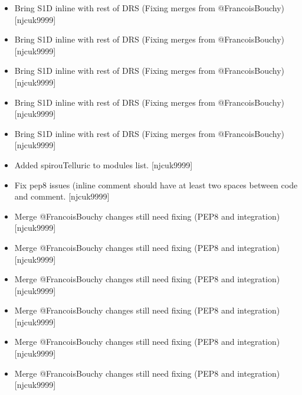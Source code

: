 \documentclass[a4paper,10pt,english]{report}
\begin{document}
\begin{itemize}
\item {} 
Bring S1D  in\sphinxhyphen{}line with rest of DRS (Fixing merges from
@FrancoisBouchy) {[}njcuk9999{]}

\item {} 
Bring S1D  in\sphinxhyphen{}line with rest of DRS (Fixing merges from
@FrancoisBouchy) {[}njcuk9999{]}

\item {} 
Bring S1D  in\sphinxhyphen{}line with rest of DRS (Fixing merges from
@FrancoisBouchy) {[}njcuk9999{]}

\item {} 
Bring S1D  in\sphinxhyphen{}line with rest of DRS (Fixing merges from
@FrancoisBouchy) {[}njcuk9999{]}

\item {} 
Bring S1D  in\sphinxhyphen{}line with rest of DRS (Fixing merges from
@FrancoisBouchy) {[}njcuk9999{]}

\item {} 
Added spirouTelluric to modules list. {[}njcuk9999{]}

\item {} 
Fix pep8 issues (in\sphinxhyphen{}line comment should have at least two spaces
between code and comment. {[}njcuk9999{]}

\item {} 
Merge @FrancoisBouchy changes \sphinxhyphen{} still need fixing (PEP8 and
integration) {[}njcuk9999{]}

\item {} 
Merge @FrancoisBouchy changes \sphinxhyphen{} still need fixing (PEP8 and
integration) {[}njcuk9999{]}

\item {} 
Merge @FrancoisBouchy changes \sphinxhyphen{} still need fixing (PEP8 and
integration) {[}njcuk9999{]}

\item {} 
Merge @FrancoisBouchy changes \sphinxhyphen{} still need fixing (PEP8 and
integration) {[}njcuk9999{]}

\item {} 
Merge @FrancoisBouchy changes \sphinxhyphen{} still need fixing (PEP8 and
integration) {[}njcuk9999{]}

\item {} 
Merge @FrancoisBouchy changes \sphinxhyphen{} still need fixing (PEP8 and
integration) {[}njcuk9999{]}


\end{itemize}
\end{document}
